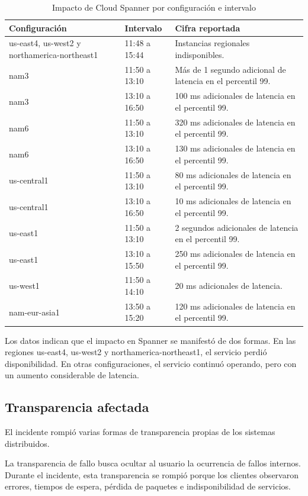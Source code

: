 \documentclass[11pt]{article}
\begin{document}
\begin{table}[htbp]
\centering
\caption{Impacto de Cloud Spanner por configuración e intervalo}
\label{tab:spanner}
\small
\begin{tabularx}{\textwidth}{p{4.2cm}p{3.2cm}X}
\hline
\textbf{Configuración} & \textbf{Intervalo} & \textbf{Cifra reportada} \\
\hline
us-east4, us-west2 y northamerica-northeast1 & 11:48 a 15:44 & Instancias regionales indisponibles. \\
nam3 & 11:50 a 13:10 & Más de 1 segundo adicional de latencia en el percentil 99. \\
nam3 & 13:10 a 16:50 & 100 ms adicionales de latencia en el percentil 99. \\
nam6 & 11:50 a 13:10 & 320 ms adicionales de latencia en el percentil 99. \\
nam6 & 13:10 a 16:50 & 130 ms adicionales de latencia en el percentil 99. \\
us-central1 & 11:50 a 13:10 & 80 ms adicionales de latencia en el percentil 99. \\
us-central1 & 13:10 a 16:50 & 10 ms adicionales de latencia en el percentil 99. \\
us-east1 & 11:50 a 13:10 & 2 segundos adicionales de latencia en el percentil 99. \\
us-east1 & 13:10 a 15:50 & 250 ms adicionales de latencia en el percentil 99. \\
us-west1 & 11:50 a 14:10 & 20 ms adicionales de latencia. \\
nam-eur-asia1 & 13:50 a 15:20 & 120 ms adicionales de latencia en el percentil 99. \\
\hline
\end{tabularx}
\end{table}

Los datos indican que el impacto en Spanner se manifestó de dos formas. En las regiones
us-east4, us-west2 y northamerica-northeast1, el servicio perdió disponibilidad. En otras
configuraciones, el servicio continuó operando, pero con un aumento considerable de latencia.
\cite{googlecloud19009}

\subsection{Transparencia afectada}

El incidente rompió varias formas de transparencia propias de los sistemas distribuidos.

La transparencia de fallo busca ocultar al usuario la ocurrencia de fallos internos. Durante
el incidente, esta transparencia se rompió porque los clientes observaron errores, tiempos de
espera, pérdida de paquetes e indisponibilidad de servicios. \cite{googlecloud19009}
\end{document}
